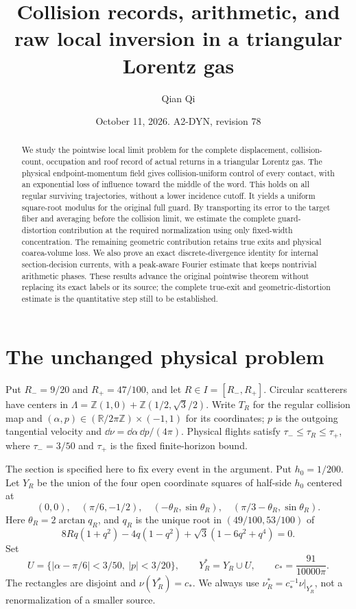 \documentclass[11pt,reqno]{amsart}
\title[Collision records and raw local inversion]{Collision records, arithmetic, and raw local inversion in a triangular Lorentz gas}
\author{Qian Qi}
\date{October 11, 2026. A2-DYN, revision 78}
\numberwithin{equation}{section}
\theoremstyle{definition}
\theoremstyle{remark}\newtheorem{remark}[theorem]{Remark}
\newcommand{\R}{\mathbb R}\newcommand{\Z}{\mathbb Z}
\begin{document}
\raggedbottom
\begin{abstract}
We study the pointwise local limit problem for the complete displacement,
collision-count, occupation and roof record of actual returns in a
triangular Lorentz gas. The physical endpoint-momentum field gives
collision-uniform control of every contact, with an exponential loss
of influence toward the middle of the word. This holds on all regular
surviving trajectories, without a lower incidence cutoff. It yields a
uniform square-root modulus for the original full guard. By transporting
its error to the target fiber and averaging before the collision limit,
we estimate the complete guard-distortion contribution at the required
normalization using only fixed-width concentration. The remaining
geometric contribution retains true exits and physical coarea-volume
loss. We also prove an exact discrete-divergence identity for internal
section-decision currents, with a peak-aware Fourier estimate that keeps
nontrivial arithmetic phases. These results advance the original
pointwise theorem without replacing its exact labels or its source;
the complete true-exit and geometric-distortion estimate is the
quantitative step still to be established.
\end{abstract}
\maketitle

\section{The unchanged physical problem}
Put $R_-=9/20$ and $R_+=47/100$, and let $R\in I=[R_-,R_+]$. Circular scatterers have centers in
$\Lambda=\Z(1,0)+\Z(1/2,\sqrt3/2)$. Write $T_R$ for the regular
collision map and $(\alpha,p)\in(\R/2\pi\Z)\times(-1,1)$ for its
coordinates; $p$ is the outgoing tangential velocity and
$\dd\nu=\dd\alpha\,\dd p/(4\pi)$. Physical flights satisfy
$\tau_-\le\tau_R\le\tau_+$, where $\tau_-=3/50$ and $\tau_+$
is the fixed finite-horizon bound.

The section is specified here to fix every event in the argument.
Put $h_0=1/200$. Let $Y_R$ be the union of the four open coordinate
squares of half-side $h_0$ centered at
\[
 (0,0),\quad(\pi/6,-1/2),\quad
 (-\theta_R,\sin\theta_R),\quad
 (\pi/3-\theta_R,\sin\theta_R).
\]
Here $\theta_R=2\arctan q_R$, and $q_R$ is the unique root in
$(49/100,53/100)$ of
\[
 8Rq(1+q^2)-4q(1-q^2)+\sqrt3(1-6q^2+q^4)=0.
\]
Set
\[
 U=\{|\alpha-\pi/6|<3/50,\ |p|<3/20\},\qquad
 Y_R^*=Y_R\cup U,\qquad c_*=\frac{91}{10000\pi}.
\]
The rectangles are disjoint and $\nu(Y_R^*)=c_*$. We always use
$\nu_R^*=c_*^{-1}\nu|_{Y_R^*}$, not a renormalization of a smaller
source.
\end{document}
